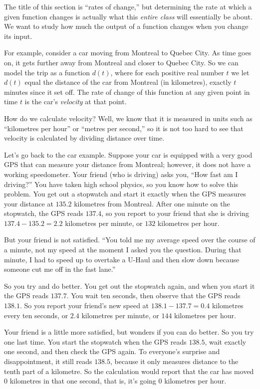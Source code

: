 The title of this section is ``rates of change,'' but determining the rate at which a given function changes
is actually what this {\it entire class}
will essentially be about. We want to study how much the output of a function changes when you change its input.

For example, consider a car moving from Montreal to Quebec City. As time goes on, it gets further away from
Montreal and closer to Quebec City. So we can model the trip as a function $d(t)$, where for each positive
real number $t$ we let $d(t)$ equal the distance of the car from Montreal (in kilometres),
exactly $t$ minutes since it
set off. The rate of change of this function at any given point in time $t$ is the car's {\it velocity} at that
point.

How do we calculate velocity? Well, we know that it is measured in units such as ``kilometres per hour''
or ``metres per second,'' so it is not too hard to see that velocity is calculated by dividing distance
over time.

Let's go back to the car example. Suppose your car is equipped with a very good GPS that can measure your
distance from Montreal; however, it does not have a working speedometer. Your friend (who is driving) asks
you, ``How fast am I driving?'' You have taken high school physics, so you know how to solve this problem.
You get out a stopwatch and start it exactly when the GPS measures your distance at $135.2$ kilometres
from Montreal. After one
minute on the stopwatch, the GPS reads $137.4$, so you report to your friend that she is driving
$137.4-135.2 = 2.2$ kilometres per minute, or $132$ kilometres per hour.

But your friend is not satisfied. ``You told me my average speed over the course of a minute, not my speed
at the moment I asked you the question. During that minute, I had to speed up to overtake a U-Haul and then
slow down because someone cut me off in the fast lane.''

So you try and do better. You get out the stopwatch again, and when you start it the GPS reads $137.7$.
You wait ten seconds, then observe that the GPS reads $138.1$. So you report your friend's new speed at
$138.1-137.7 = 0.4$ kilometres every ten seconds, or $2.4$ kilometres per minute, or $144$ kilometres per
hour.

Your friend is a little more satisfied, but wonders if you can do better. So you try one last time. You
start the stopwatch when the GPS reads $138.5$, wait exactly one second, and then check the GPS again.
To everyone's surprise and disappointment, it still reads $138.5$, because it only measures distance to the
tenth part of a kilometre. So the calculation would report
that the car has moved $0$ kilometres in that one second, that is, it's going $0$ kilometres per hour.

